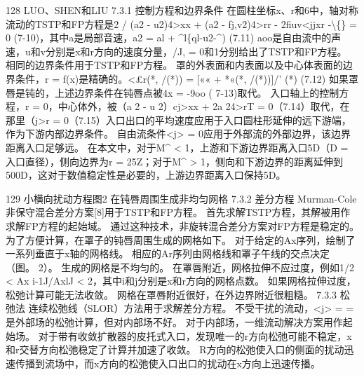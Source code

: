 \documentclass[UTF8,11pt,a4paper,openany,fontset=fandol]{ctexbook}
\begin{document}
128 LUO、SHEN和LIU 7.3.1 控制方程和边界条件 在圆柱坐标x、r和6中，轴对称流动的TSTP和FP方程是2 / (a2 - u2)4>xx + (a2 - fj,v2)4>rr - 2fiuv<jjxr -\textbackslash\{\} = 0 (7-10)，其中a是局部音速，a2 = al + \textasciicircum{}l\{ql-u2-\textasciicircum{}) (7.11) aoo是自由流中的声速，u和v分别是x和r方向的速度分量，/J, = 0和1分别给出了TSTP和FP方程。 相同的边界条件用于TSTP和FP方程。 罩的外表面和内表面以及中心体表面的边界条件，r = f(x)是精确的。<£r(*, /(*)) = [«« + *«(*, /(*))]/' (*) (7.12) 如果罩唇是钝的，上述边界条件在钝唇点被4x = -9oo ( 7-13)取代。 入口轴上的控制方程，r = 0，中心体外，被（a 2 - u 2）cj>xx + 2a 24>rT = 0（7.14）取代，在那里（j>r = 0（7.15）入口出口的平均速度应用于入口圆柱形延伸的远下游端，作为下游内部边界条件。 自由流条件<j> = 0应用于外部流的外部边界，该边界距离入口足够远。 在本文中，对于M\textasciicircum{} < 1，上游和下游边界距离入口5D（D = 入口直径），侧向边界为r = 25Z；对于M\textasciicircum{} > 1，侧向和下游边界的距离延伸到500D，这对于数值稳定性是必要的，上游边界距离入口保持5D。

129 小横向扰动方程图2 在钝唇周围生成非均匀网格 7.3.2 差分方程 Murman-Cole非保守混合差分方案[8]用于TSTP和FP方程。 首先求解TSTP方程，其解被用作求解FP方程的起始域。 通过这种技术，非旋转混合差分方案对FP方程是稳定的。 为了方便计算，在罩子的钝唇周围生成的网格如下。 对于给定的Ax序列，绘制了一系列垂直于x轴的网格线。 相应的Ar序列由网格线和罩子午线的交点决定（图。 2）。 生成的网格是不均匀的。 在罩唇附近，网格拉伸不应过度，例如1/2 < Ax i-1J/AxlJ < 2，其中i和j分别是x和r方向的网格点数。 如果网格拉伸过度，松弛计算可能无法收敛。 网格在罩唇附近很好，在外边界附近很粗糙。 7.3.3 松弛法 连续松弛线（SLOR）方法用于求解差分方程。 不受干扰的流动，<j> = =是外部场的松弛计算，但对内部场不好。 对于内部场，一维流动解决方案用作起始场。 对于带有收敛扩散器的皮托式入口，发现唯一的r方向松弛可能不稳定，x和r交替方向松弛稳定了计算并加速了收敛。 R方向的松弛使入口的侧面的扰动迅速传播到流场中，而x方向的松弛使入口出口的扰动在x方向上迅速传播。
\end{document}
